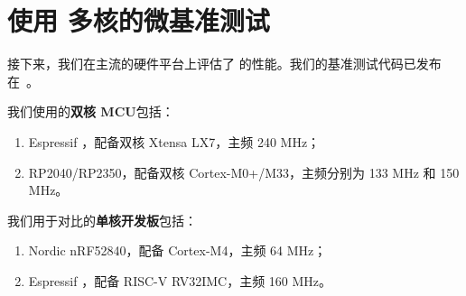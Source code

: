 \section{使用 \OSname{} 多核的微基准测试}
\label{sec:benchmarks}





接下来，我们在主流的硬件平台上评估了 \OSname{} 的性能。我们的基准测试代码已发布在~\cite{ariel-benchmarks}。

我们使用的\textbf{双核 MCU}包括：
\begin{enumerate}[label=(\roman*)]
\item Espressif \espsthree{}，配备双核 Xtensa LX7，主频 240 MHz；
\item RP2040/RP2350，配备双核 Cortex-M0+/M33，主频分别为 133 MHz 和 150 MHz。
\end{enumerate}

我们用于对比的\textbf{单核开发板}包括：
\begin{enumerate}[label=(\roman*)]
\item Nordic nRF52840，配备 Cortex-M4，主频 64 MHz；
\item Espressif \espcthree{}，配备 RISC-V RV32IMC，主频 160 MHz。
\end{enumerate}
\iffalse
We measured performance on the following popular boards, commercially available off-the-shelf: 
\begin{itemize}
    \item Nordic nRF52840: Arm Cortex\nobreakdash-M4, single-core, 64 MHz, 256 KB RAM, 1 MB Flash memory;
    \item Espressif \espcthree{}: RISC\nobreakdash-V RV32IMC, single-core, 160 MHz, 400 KB SRAM, 4 MB Flash memory;
    \item Espressif \espsthree{}: Xtensa LX7, dual-core, 240 MHz, 8 MB RAM, 16 MB Flash memory;
    \item RaspberryPi Pico: Arm Cortex\nobreakdash-M0+, dual-core,  133 MHz, 264 KB SRAM, 2 MB Flash memory.
\end{itemize}
\fi

